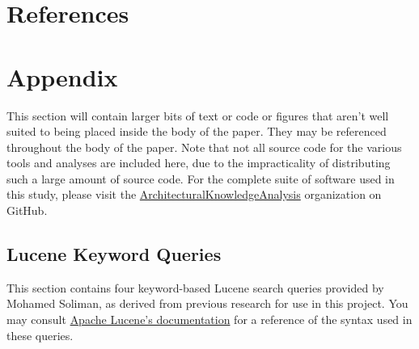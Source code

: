 \documentclass[a4paper, 12pt]{article}
\begin{document}
\section{References}
	\printbibliography[heading=none]
	\newpage

\section{Appendix}
	This section will contain larger bits of text or code or figures that aren't well suited to being placed inside the body of the paper. They may be referenced throughout the body of the paper. Note that not all source code for the various tools and analyses are included here, due to the impracticality of distributing such a large amount of source code. For the complete suite of software used in this study, please visit the \href{https://github.com/ArchitecturalKnowledgeAnalysis}{ArchitecturalKnowledgeAnalysis} organization on GitHub.
	
	\newpage
	\subsection{Lucene Keyword Queries}
		\label{sec:queries}
		This section contains four keyword-based Lucene search queries provided by Mohamed Soliman, as derived from previous research for use in this project. You may consult \href{https://lucene.apache.org/core/9_2_0/queryparser/org/apache/lucene/queryparser/classic/package-summary.html#package.description}{Apache Lucene's documentation} for a reference of the syntax used in these queries.
		
\end{document}
